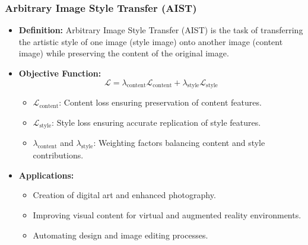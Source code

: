 
\begin{frame}
\frametitle{Arbitrary Image Style Transfer (AIST)}

\begin{itemize}
    \item \textbf{Definition:} Arbitrary Image Style Transfer (AIST) is the task of transferring the artistic style of one image (style image) onto another image (content image) while preserving the content of the original image.
    \item \textbf{Objective Function:}
    \[
    \mathcal{L} = \lambda_{\text{content}} \mathcal{L}_{\text{content}} + \lambda_{\text{style}} \mathcal{L}_{\text{style}}
    \]
    \begin{itemize}
        \item \(\mathcal{L}_{\text{content}}\): Content loss ensuring preservation of content features.
        \item \(\mathcal{L}_{\text{style}}\): Style loss ensuring accurate replication of style features.
        \item \(\lambda_{\text{content}}\) and \(\lambda_{\text{style}}\): Weighting factors balancing content and style contributions.
    \end{itemize}
    \item \textbf{Applications:}
    \begin{itemize}
        \item Creation of digital art and enhanced photography.
        \item Improving visual content for virtual and augmented reality environments.
        \item Automating design and image editing processes.
    \end{itemize}
\end{itemize}

\end{frame}

